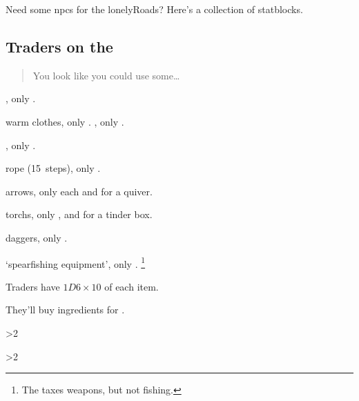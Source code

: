 \documentclass[10pt,twoside]{book}
\begin{document}
\frontmatter


\noindent
Need some \glspl{npc} for the \glspl{lonelyRoad}?
Here's a collection of \glspl{statblock}.

\clearpage
\pagestyle{minizine}

\subsection{Traders on the }

\begin{quotation}
  You look like you could use some\ldots
\end{quotation}

\begin{dlist}
  \item
  \ifnum{}%
    \rations, only .
    \item warm clothes, only .
  \else%
    \rations, only .
    \item \rations, only .
  \fi%
  \item rope (15~\glspl{step}), only .
  \item arrows, only  each and  for a quiver.
  \item \glspl{torch}, only , and  for a tinder box.
  \ifodd\day%
    \item daggers, only .
  \else%
    \item `spearfishing equipment', only .%
    \footnote{The  taxes weapons, but not fishing.}
  \fi%
\end{dlist}

Traders have $1D6\times 10$ of each item.

They'll buy \glspl{ingredient} for .

\humantrader

\humantrader

\donkey

\doula
\ifnum\themp>2
  {\showStdSpells}
\fi

\doula
\ifnum\themp>2
  {\showStdSpells}
\fi

\end{document}
